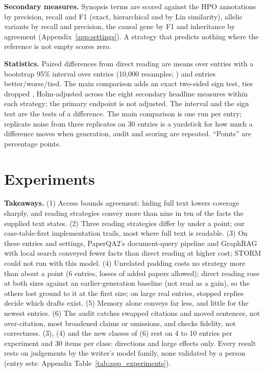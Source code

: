 \documentclass{article} %
\begin{document}
\textbf{Secondary measures.} Synopsis terms are scored against the HPO annotations by precision, recall and F1 (exact, hierarchical and by Lin similarity), allelic variants by recall and precision, the causal gene by F1 and inheritance by agreement (Appendix~\ref{app:settings}). A strategy that predicts nothing where the reference is not empty scores zero.

\textbf{Statistics.} Paired differences from direct reading are means over entries with a bootstrap 95\% interval over entries (10,000 resamples; \citealp{Efron1979BootstrapMethods}) and entries better/worse/tied. The main comparison adds an exact two-sided sign test, ties dropped \citep{Dixon1946StatisticalSign}, Holm-adjusted \citep{holm1979simple} across the eight secondary headline measures within each strategy; the primary endpoint is not adjusted. The interval and the sign test are the tests of a difference. The main comparison is one run per entry; replicate noise from three replicates on 30 entries is a yardstick for how much a difference moves when generation, audit and scoring are repeated. ``Points'' are percentage points.

\section{Experiments}
\label{sec:experiments}
\textbf{Takeaways.} (1) Access bounds agreement: hiding full text lowers coverage sharply, and reading strategies convey more than nine in ten of the facts the supplied text states. (2) Three reading strategies differ by under a point; our case-table-first implementation trails, most where full text is readable. (3) On these entries and settings, PaperQA2's document-query pipeline and GraphRAG with local search conveyed fewer facts than direct reading at higher cost; STORM could not run with this model. (4) Unrelated padding costs no strategy more than about a point (6 entries, losses of added papers allowed); direct reading rose at both sizes against an earlier-generation baseline (not read as a gain), so the others lost ground to it at the first size; on large real entries, stopped replies decide which drafts exist. (5) Memory alone conveys far less, and little for the newest entries. (6) The audit catches swapped citations and moved sentences, not over-citation, most broadened claims or omissions, and checks fidelity, not correctness. (3), (4) and the new classes of (6) rest on 4 to 10 entries per experiment and 30 items per class: directions and large effects only. Every result rests on judgements by the writer's model family, none validated by a person (entry sets: Appendix Table~\ref{tab:app_experiments}).
\end{document}

